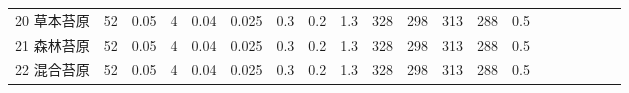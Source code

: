 \begin{sidewaystable}[]
\begin{tabular}{@{}lccccccccccccccccccc@{}}
    20 草本苔原    & 52                                                                & 0.05                                                                                                   & 4                                                                                  & 0.04                                                                               & 0.025                                                               & 0.3                                                       & 0.2                                                       & 1.3                                                       & 328                                                             & 298                                                             & 313                                                              & 288                                                               & 0.5                                                          \\
    21 森林苔原    & 52                                                                & 0.05                                                                                                   & 4                                                                                  & 0.04                                                                               & 0.025                                                               & 0.3                                                       & 0.2                                                       & 1.3                                                       & 328                                                             & 298                                                             & 313                                                              & 288                                                               & 0.5                                                          \\
    22 混合苔原    & 52                                                                & 0.05                                                                                                   & 4                                                                                  & 0.04                                                                               & 0.025                                                               & 0.3                                                       & 0.2                                                       & 1.3                                                       & 328                                                             & 298                                                             & 313                                                              & 288                                                               & 0.5                                                          \\

\end{tabular}
\end{sidewaystable}
